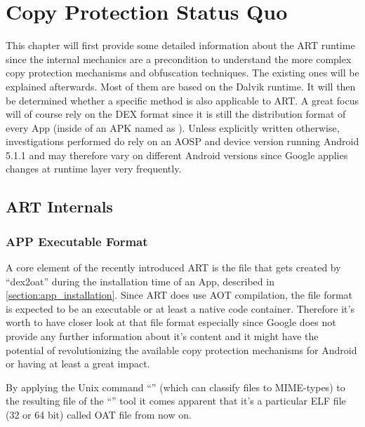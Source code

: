 \chapter{Copy Protection Status Quo}
\label{chapter:copy_protection_status_quo}

This chapter will first provide some detailed information about the ART runtime since the internal mechanics are a precondition to understand the more complex copy protection mechanisms and obfuscation techniques. The existing ones will be explained afterwards. Most of them are based on the Dalvik runtime. It will then be determined whether a specific method is also
applicable to ART. A great focus will of course rely on the DEX format since
it is still the distribution format of every App (inside of an APK named as
). Unless explicitly written otherwise, investigations performed do rely on an AOSP and device version running Android 5.1.1 and may therefore vary on different Android versions since Google applies changes
at runtime layer very frequently.

\section{ART Internals}
\label{section:art_internals}

\subsection{APP Executable Format}\label{section:app_executable_format}

A core element of the recently introduced ART is the file that
gets created by ``dex2oat'' during the installation time of an App,
described in \autoref{section:app_installation}.
Since ART does use AOT compilation, the file format is expected
to be an executable or at least a native code container.
Therefore it's worth to have closer look at that file format
especially since Google does not provide any further information
about it's content and it might have the potential of
revolutionizing the available copy protection mechanisms for
Android or having at least a great impact.

By applying the Unix command ``'' (which can classify
files to MIME-types) to the resulting file of the ``''
tool it comes apparent that it's a particular ELF file (32 or 64 bit)
called OAT file from now on.

